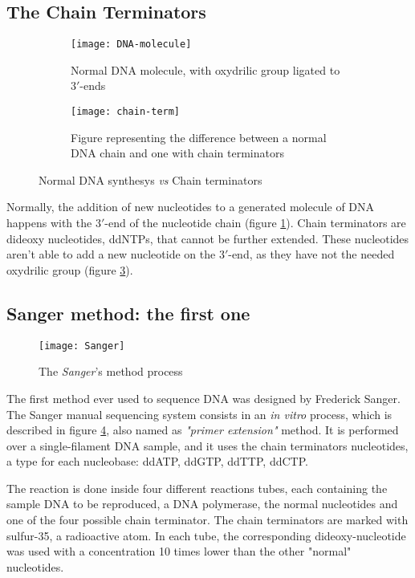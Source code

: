 \subsection{The Chain Terminators}

\begin{figure}[H]
    \centering
    \begin{subfigure}[b]{0.49\textwidth}
        \centering
        \texttt{[image: DNA-molecule]}
        \caption{Normal DNA molecule, with oxydrilic group ligated to $3'$-ends}
        \label{normalDNAaddition}
    \end{subfigure}
    \hfill
    \begin{subfigure}[b]{0.49\textwidth}
        \centering
        \texttt{[image: chain-term]}
        \caption{Figure representing the difference between a normal DNA chain and one with chain terminators}
        \label{ChainTerm}
    \end{subfigure}
    \caption{Normal DNA synthesys \textit{vs} Chain terminators}
\end{figure}


Normally, the addition of new nucleotides to a generated molecule of DNA happens with the $3'$-end of the nucleotide chain (figure \ref{normalDNAaddition}). Chain terminators are dideoxy nucleotides, ddNTPs, that cannot be further extended. These nucleotides aren't able to add a new nucleotide on the $3'$-end, as they have not the needed oxydrilic group (figure \ref{ChainTerm}).

\subsection{Sanger method: the first one}

\begin{figure}[h]
\caption{The \textit{Sanger}'s method process}
\centering
\texttt{[image: Sanger]}
\label{Sanger}
\end{figure}

The first method ever used to sequence DNA was designed by Frederick Sanger. The Sanger manual sequencing system consists in an \textit{in vitro} process, which is described in figure \ref{Sanger}, also named as \textit{"primer extension"} method. It is performed over a single-filament DNA sample, and it uses the chain terminators nucleotides, a type for each nucleobase: ddATP, ddGTP, ddTTP, ddCTP.

The reaction is done inside four different reactions tubes, each containing the sample DNA to be reproduced, a DNA polymerase, the normal nucleotides and one of the four possible chain terminator. The chain terminators are marked with sulfur-35, a radioactive atom. In each tube, the corresponding dideoxy-nucleotide was used with a concentration 10 times lower than the other "normal" nucleotides.


